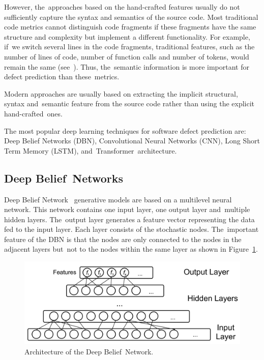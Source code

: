 \documentclass[mathematics,review,accept,moreauthors,pdftex]{Definitions/mdpi}
\begin{document}
However, the~approaches based on the hand-crafted features usually do not sufficiently capture the syntax and semantics of the source code. 
Most traditional code metrics cannot distinguish code fragments if these fragments have the same structure and complexity but implement a different functionality.
For example, if~we switch several lines in the code fragments, traditional features, such as the number of lines of code, number of function calls and number of tokens, would remain the same (see~\cite{WangEtAl2016}). Thus, the~semantic information is more important for defect prediction than these~metrics.

Modern approaches are usually based on extracting the implicit structural, syntax and~semantic feature from the source code rather than using the explicit hand-crafted~ones.

The most popular deep learning techniques for software defect prediction are: Deep Belief Networks (DBN), Convolutional Neural Networks (CNN), Long Short Term Memory (LSTM), and~Transformer~architecture.

\subsection{Deep Belief~Networks}

Deep Belief Network~\cite{Bengio2009dbn} generative models are based on a multilevel neural network. This network contains one input layer, one output layer and~multiple hidden layers. The~output layer generates a feature vector representing the data fed to the input layer. Each layer consists of the stochastic nodes. The~important feature of the DBN is that the nodes are only connected to the nodes in the adjacent layers but~not to the nodes within the same layer as shown in Figure~\ref{fig2}.

\begin{figure}[H] %
\includegraphics[width=10.5 cm]{f2.png}
\caption{Architecture of the Deep Belief~Network.}
\label{fig2} %
\end{figure}
\end{document}

